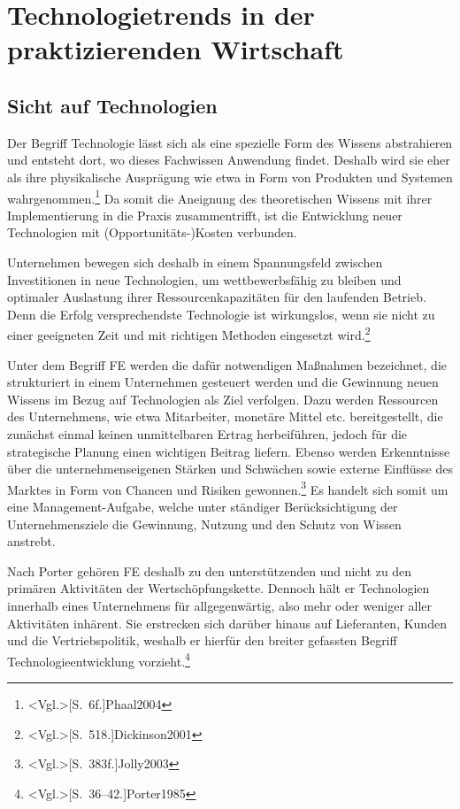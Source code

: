 \section{Technologietrends in der praktizierenden Wirtschaft}

\subsection{Sicht auf Technologien}\label{sec:sight}
Der Begriff Technologie lässt sich als eine spezielle Form des Wissens abstrahieren und entsteht dort, wo dieses Fachwissen Anwendung findet. Deshalb wird sie eher als ihre physikalische Ausprägung wie etwa in Form von Produkten und Systemen wahrgenommen.\footnote{\citeNP<Vgl.>[S.~6f.]{Phaal2004}} Da somit die Aneignung des theoretischen Wissens mit ihrer Implementierung in die Praxis zusammentrifft, ist die Entwicklung neuer Technologien mit (Opportunitäts-)Kosten verbunden.

Unternehmen bewegen sich deshalb in einem Spannungsfeld zwischen Investitionen in neue Technologien, um wettbewerbsfähig zu bleiben und optimaler Auslastung ihrer Ressourcenkapazitäten für den laufenden Betrieb. Denn die Erfolg versprechendste Technologie ist wirkungslos, wenn sie nicht zu einer geeigneten Zeit und mit richtigen Methoden eingesetzt wird.\footnote{\citeNP<Vgl.>[S.~518.]{Dickinson2001}}

Unter dem Begriff \ac{FE} werden die dafür notwendigen Maßnahmen bezeichnet, die strukturiert in einem Unternehmen gesteuert werden und die Gewinnung neuen Wissens im Bezug auf Technologien als Ziel verfolgen. Dazu werden Ressourcen des Unternehmens, wie etwa Mitarbeiter, monetäre Mittel etc. bereitgestellt, die zunächst einmal keinen unmittelbaren Ertrag herbeiführen, jedoch für die strategische Planung einen wichtigen Beitrag liefern. Ebenso werden Erkenntnisse über die unternehmenseigenen Stärken und Schwächen sowie externe Einflüsse des Marktes in Form von Chancen und Risiken gewonnen.\footnote{\citeNP<Vgl.>[S.~383f.]{Jolly2003}} Es handelt sich somit um eine Management-Aufgabe, welche unter ständiger Berücksichtigung der Unternehmensziele die Gewinnung, Nutzung und den Schutz von Wissen anstrebt.

Nach Porter gehören \ac{FE} deshalb zu den unterstützenden und nicht zu den primären Aktivitäten der Wertschöpfungskette. Dennoch hält er Technologien innerhalb eines Unternehmens für allgegenwärtig, also mehr oder weniger aller Aktivitäten inhärent. Sie erstrecken sich darüber hinaus auf Lieferanten, Kunden und die Vertriebspolitik, weshalb er hierfür den breiter gefassten Begriff Technologieentwicklung vorzieht.\footnote{\citeNP<Vgl.>[S.~36--42.]{Porter1985}}

